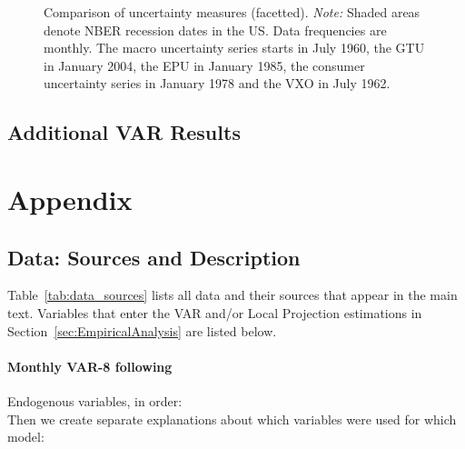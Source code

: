 \documentclass[a4paper,11pt,listof=nochaptergap,oneside,pointednumbers,bibtotoc,bigheadings,liststotoc]{scrbook}
\theoremstyle{mysatz}
\theoremstyle{mydefinition}
\theoremstyle{mybemerkung}
\renewcommand*{\paragraph}[1]{\subsubsection*{#1} \vspace{-3mm}} %
\begin{document}
\begin{itemize}
\begin{landscape}
\begin{figure}[!t]
   \centering
   \setlength\fboxsep{0pt}
   \setlength\fboxrule{0pt}
      \caption[Comparison of uncertainty measures (combined).]{Comparison of uncertainty measures (facetted).
      \textit{Note:} Shaded areas denote NBER recession dates in the US. Data frequencies are monthly. The macro uncertainty series starts in July 1960, the GTU in January 2004, the EPU in January 1985, the consumer uncertainty series in January 1978  and the VXO in July 1962.}   \label{fig:bloom_shock_all_until2016}
\end{figure}
\end{landscape}



\section{Additional VAR Results}




\chapter{Appendix}
\label{DataAndCode}
\section{Data: Sources and Description}
\label{sec:data}
Table~\ref{tab:data_sources} lists all data and their sources that appear in the main text. Variables that enter the VAR and/or Local Projection estimations in Section~\ref{sec:EmpiricalAnalysis} are listed below.


\paragraph{Monthly VAR-8 following \citet{bloom:09}} Endogenous variables, in order:\\
Then we create separate explanations about which variables were used for which model:\\


\end{itemize}
\end{document}
